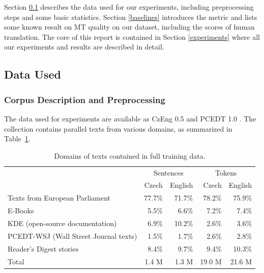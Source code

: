 \documentclass[11pt]{report}
\theoremstyle{plain}
\begin{document}
{{Section \ref{data} describes the data used for our experiments, including
preprocessing steps and some basic statistics. Section \ref{baselines}
introduces the metric and lists some known result on MT quality on our
dataset, including the scores of human translation. The core of this report is
contained in Section \ref{experiments} where all our experiments and results are
described in detail.




\subsection{Data Used}
\label{data}




\subsubsection{Corpus Description and Preprocessing}
\label{tools}


The data used for \bidir{} experiments are available as CzEng 0.5
 and PCEDT 1.0 . The collection contains parallel texts from various domains, as
summarized in Table~\ref{czengratios}.


\begin{table}[ht]
\begin{tabular}{lrr|rr}
  &  \multicolumn{2}{c}{Sentences}  &  \multicolumn{2}{c}{Tokens}\\
  &  Czech                             &  English                          &  Czech  &  English\\
\hline
Texts from European Parliament         &  77.7\%  &  71.7\%  &  78.2\%  &  75.9\%\\
E-Books                                &  5.5\%   &  6.6\%   &  7.2\%   &  7.4\%\\
KDE (open-source documentation)        &  6.9\%   &  10.2\%  &  2.6\%   &  3.6\%\\
PCEDT-WSJ (Wall Street Journal texts)  &  1.5\%   &  1.7\%   &  2.6\%   &  2.8\%\\
Reader's Digest stories                &  8.4\%   &  9.7\%   &  9.4\%   &  10.3\%\\
\hline
Total                                  &  1.4 M   &  1.3 M   &  19.0 M  &  21.6 M\\
\end{tabular}
\caption{Domains of texts contained in full training data.}
\label{czengratios}
\end{table}

}}
\end{document}
